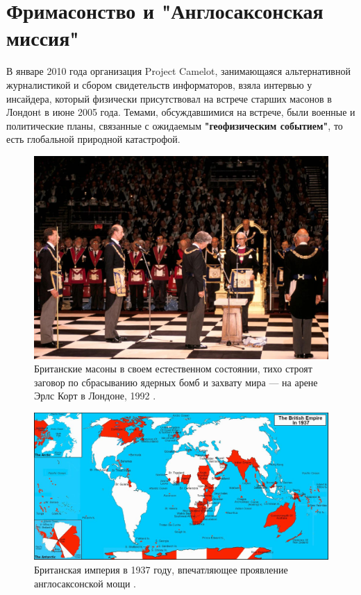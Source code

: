 \documentclass[10pt,twocolumn,letterpaper]{article}
\begin{document}
\section{Фримасонство и "Англосаксонская миссия"}

В январе 2010 года организация Project Camelot, занимающаяся альтернативной журналистикой и сбором свидетельств информаторов, взяла интервью \cite{4,6} у инсайдера, который физически присутствовал на встрече старших масонов в Лондонt в июне 2005 года. Темами, обсуждавшимися на встрече, были военные и политические планы, связанные с ожидаемым \textbf{"геофизическим событием"}, то есть глобальной природной катастрофой.

\begin{figure}[b]
\begin{center}
\includegraphics[width=1\linewidth]{freemason.jpg}
\end{center}
   \caption{Британские масоны в своем естественном состоянии, тихо строят заговор по сбрасыванию ядерных бомб и захвату мира — на арене Эрлс Корт в Лондоне, 1992 \cite{5}.}
\label{fig:1}
\label{fig:onecol}
\end{figure}

\begin{figure}[t]
\begin{center}
\includegraphics[width=1\textwidth]{british.jpg}
\end{center}
   \caption{Британская империя в 1937 году, впечатляющее проявление англосаксонской мощи \cite{14}.}
   \label{fig:2}
\end{figure}
\end{document}
